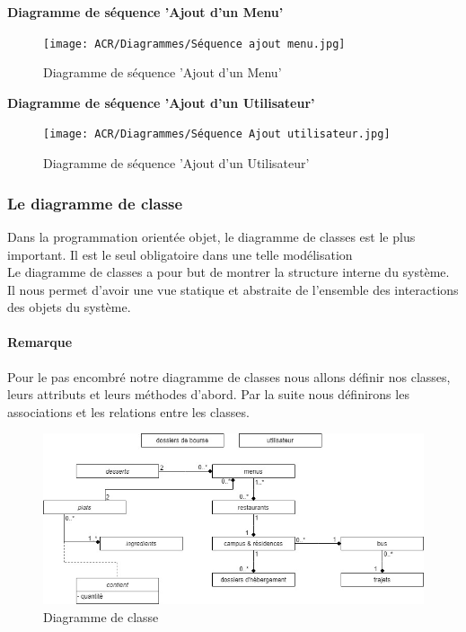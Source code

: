 \textbf{Diagramme de séquence 'Ajout d'un Menu'}
\begin{figure}[H]
    \centering
    \texttt{[image: ACR/Diagrammes/Séquence ajout menu.jpg]}
    \caption{Diagramme de séquence 'Ajout d'un Menu'}
\end{figure}

\textbf{Diagramme de séquence 'Ajout d'un Utilisateur'}
\begin{figure}[H]
    \centering
    \texttt{[image: ACR/Diagrammes/Séquence Ajout utilisateur.jpg]}
    \caption{Diagramme de séquence 'Ajout d'un Utilisateur'}
\end{figure}

\subsubsection{Le diagramme de classe}
Dans la programmation orientée objet, le diagramme de classes est le plus important. Il est le seul obligatoire dans une telle modélisation\\

Le diagramme de classes a pour but de montrer la structure interne du système. Il nous permet d'avoir une vue statique et abstraite de l'ensemble des interactions des objets du système.\\

\paragraph*{Remarque} Pour le pas encombré notre diagramme de classes nous allons définir nos classes, leurs attributs et leurs méthodes d'abord. Par la suite nous définirons les associations et les relations entre les classes.\\



\begin{figure}[H]
    \centering
    \includegraphics[scale=0.55]{ACR/Diagrammes/class.jpg}
    \caption{Diagramme de classe}
\end{figure}

